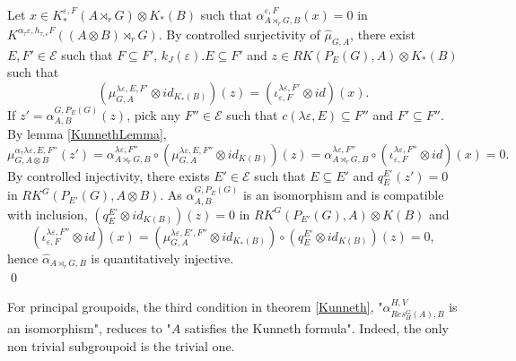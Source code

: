 \begin{dem}
Let $x\in K^{\varepsilon,F}_*(A\rtimes_r G)\otimes K_*(B)$ such that $\alpha_{A\rtimes_r G,B}^{\varepsilon,F}(x)=0$ in $K^{\alpha_\tau\varepsilon,h_{\tau,\varepsilon} F}((A\otimes B)\rtimes_r G)$. By controlled surjectivity of $\hat\mu_{G,A}$, there exist $E,F'\in\mathcal E$ such that $F\subseteq F'$, $k_J(\varepsilon).E\subseteq F'$ and $z\in RK(P_E(G),A)\otimes K_*(B)$ such that 
\[(\mu_{G,A}^{\lambda\varepsilon,E, F'}\otimes id_{K_*(B)})(z)=(\iota_{\varepsilon,F}^{\lambda\varepsilon,F'}\otimes id) (x).\] If $z' = \alpha_{A,B}^{G,P_E(G)}(z)$, pick any $F''\in\mathcal E$ such that $c(\lambda\varepsilon,E)\subseteq F''$ and $F'\subseteq F''$. By lemma \ref{KunnethLemma}, \[\mu^{\alpha_\tau \lambda\varepsilon,E,F''}_{G,A\otimes B}(z')=
\alpha^{\lambda\varepsilon,F''}_{A\rtimes_r G,B} \circ( \mu_{G,A}^{\lambda\varepsilon, E,F''}\otimes id_{K(B)})(z) = 
\alpha^{\lambda\varepsilon,F''}_{A\rtimes_r G,B}\circ (\iota_{\varepsilon,F}^{\lambda\varepsilon,F''}\otimes id) (x)=0.\] 
By controlled injectivity, there exists $E'\in\mathcal E$ such that $E\subseteq E'$ and $q_E^{E'}(z')=0$ in $RK^G(P_{E'}(G),A\otimes B)$. As $\alpha_{A,B}^{G,P_E(G)}$ is an isomorphism and is compatible with inclusion, $(q_E^{E'}\otimes id_{K(B)})(z)=0$ in $RK^G(P_{E'}(G),A)\otimes K(B)$ and
\[(\iota^{\lambda\varepsilon,F''}_{\varepsilon,F}\otimes id )(x) = (\mu_{G,A}^{\lambda\varepsilon,E', F''}\otimes id_{K_*(B)})\circ(q_E^{E'}\otimes id_{K(B)})(z) = 0,\]
hence $\hat \alpha_{A\rtimes_r G,B} $ is quantitatively injective.\\
\qed
\end{dem}

\begin{rk}
For principal groupoids, the third condition in theorem \ref{Kunneth}, "$\alpha_{Res_H^G(A),B}^{H,V}$ is an isomorphism", reduces to "$A$ satisfies the Kunneth formula". Indeed, the only non trivial subgroupoid is the trivial one.
\end{rk}



























